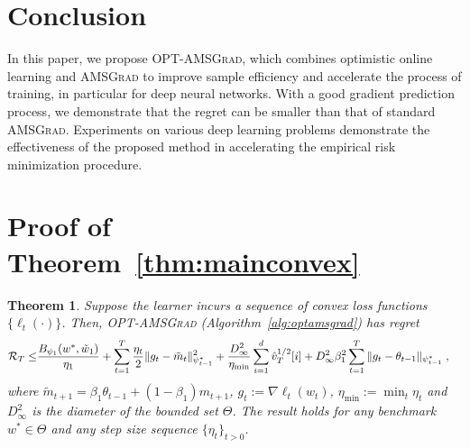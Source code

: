 \documentclass[11pt]{article}
\newtheorem*{Theorem*}{Theorem}
\theoremstyle{k}
\begin{document}
\section{Conclusion}
In this paper, we propose \textsc{OPT-AMSGrad}, which combines optimistic online learning and \textsc{AMSGrad} to improve sample efficiency and
accelerate the process of training, in particular for deep neural networks. 
With a good gradient prediction process, we demonstrate that the regret can be smaller than that of standard \textsc{AMSGrad}.
Experiments on various deep learning problems demonstrate the effectiveness of the proposed method in accelerating the empirical risk minimization procedure. 


\clearpage




\clearpage


\appendix


\section{Proof of Theorem~\ref{thm:mainconvex}}\label{app:thmmainconvex}
\begin{Theorem*}
Suppose the learner incurs a sequence of convex loss functions $\{ \ell_{t}(\cdot) \}$.
Then,  \textsc{OPT-AMSGrad} (Algorithm~\ref{alg:optamsgrad}) has regret 
\begin{equation}\notag
\begin{aligned}
\mathcal{R}_T \leq &   \frac{ B_{\psi_1}(w^*, \tilde{w}_{1})}{\eta_1}
+ \sum_{t=1}^T\frac{\eta_t}{2} \| g_t - \tilde{m}_t  \|_{\psi_{t-1}^*}^2  + \frac{D_{\infty}^2}{\eta_{\min}}  \sum_{i=1}^d \hat{v}_{T}^{1/2}[i] + D_{\infty}^2\beta_1^2   \sum_{t=1}^T  \| g_t - \theta_{t-1}  \|_{\psi_{t-1}^*}\;,
\end{aligned}
\end{equation}
where $ \tilde{m}_{t+1}  = \beta_1 \theta_{t-1} +(1-\beta_1) m_{t+1}$, $g_{t}:= \nabla \ell_{t}(w_t)$, $\eta_{{\min}} := \min_{{t}} \eta_{t}$ and $D_{\infty}^2$ is the diameter of the bounded set $\Theta$.
The result holds for any benchmark $w^{*} \in \Theta$ and any step size sequence $\{ \eta_t \}_{t>0}$.
\end{Theorem*}
\end{document}
